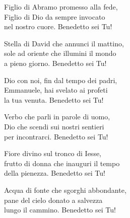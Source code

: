 

\spazio

\strofa Figlio di Abramo promesso alla fede,\\
Figlio di Dio da sempre invocato\\
nel nostro cuore. Benedetto sei Tu!

\spazio

\strofa Stella di David che annunci il mattino,\\
sole ad oriente che illumini il mondo\\
a pieno giorno. Benedetto sei Tu!

\spazio


\spazio

\strofa Dio con noi, fin dal tempo dei padri,\\
Emmanuele, hai svelato ai profeti\\
la tua venuta. Benedetto sei Tu!

\spazio

\strofa Verbo che parli in parole di uomo,\\
Dio che scendi sui nostri sentieri\\
per incontrarci. Benedetto sei Tu!

\spazio


\spazio

\strofa Fiore divino sul tronco di Iesse,\\
frutto di donna che inauguri il tempo\\
della pienezza. Benedetto sei Tu!

\spazio

\strofa Acqua di fonte che sgorghi abbondante,\\
pane del cielo donato a salvezza\\
lungo il cammino. Benedetto sei Tu!

\spazio

